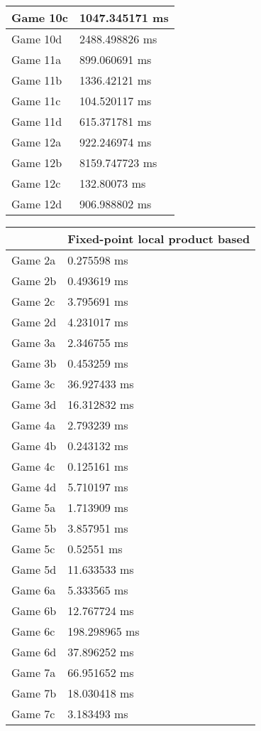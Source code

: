 \begin{tabular}{|l|l|}
	Game 10c & 1047.345171 ms \\ \hline
	Game 10d & 2488.498826 ms \\ \hline
	Game 11a & 899.060691 ms \\ \hline
	Game 11b & 1336.42121 ms \\ \hline
	Game 11c & 104.520117 ms \\ \hline
	Game 11d & 615.371781 ms \\ \hline
	Game 12a & 922.246974 ms \\ \hline
	Game 12b & 8159.747723 ms \\ \hline
	Game 12c & 132.80073 ms \\ \hline
	Game 12d & 906.988802 ms \\ \hline
\end{tabular}
\begin{tabular}{|l|l|}
	\hline
	& Fixed-point local product based \\ \hline
	Game 2a & 0.275598 ms \\ \hline
	Game 2b & 0.493619 ms \\ \hline
	Game 2c & 3.795691 ms \\ \hline
	Game 2d & 4.231017 ms \\ \hline
	Game 3a & 2.346755 ms \\ \hline
	Game 3b & 0.453259 ms \\ \hline
	Game 3c & 36.927433 ms \\ \hline
	Game 3d & 16.312832 ms \\ \hline
	Game 4a & 2.793239 ms \\ \hline
	Game 4b & 0.243132 ms \\ \hline
	Game 4c & 0.125161 ms \\ \hline
	Game 4d & 5.710197 ms \\ \hline
	Game 5a & 1.713909 ms \\ \hline
	Game 5b & 3.857951 ms \\ \hline
	Game 5c & 0.52551 ms \\ \hline
	Game 5d & 11.633533 ms \\ \hline
	Game 6a & 5.333565 ms \\ \hline
	Game 6b & 12.767724 ms \\ \hline
	Game 6c & 198.298965 ms \\ \hline
	Game 6d & 37.896252 ms \\ \hline
	Game 7a & 66.951652 ms \\ \hline
	Game 7b & 18.030418 ms \\ \hline
	Game 7c & 3.183493 ms \\ \hline

\end{tabular}
